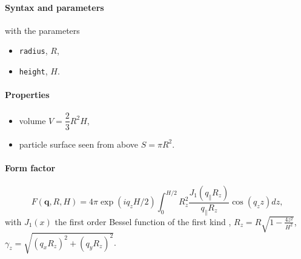\FloatBarrier

\paragraph{Syntax and parameters}
\begin{quote}
\end{quote}
with the parameters
\begin{itemize}
\item \texttt{radius}, $R$,
\item \texttt{height}, $H$.
\end{itemize}

\paragraph{Properties}
\begin{itemize}
\item volume $V =\dfrac{2}{3}R^2H$,
\item particle surface seen from above $S =\pi R^2$. 
\end{itemize}

\paragraph{Form factor}
\begin{equation*}
F(\mathbf{q}, R, H) = 4\pi \exp(i q_z H/2) \int_0 ^{H/2}R_z ^2
\frac{J_1(q_{\parallel}R_z)}{q_{\parallel}R_z} \cos(q_z z) dz,
\end{equation*}
with $J_1(x)$ the first order
Bessel function of the first kind \cite{AbSt64},
$R_z = R\sqrt{1-\frac{4z^2}{H^2}}$, $\gamma_z = \sqrt{(q_x R_z)^2+(q_y R_z)^2}$.


